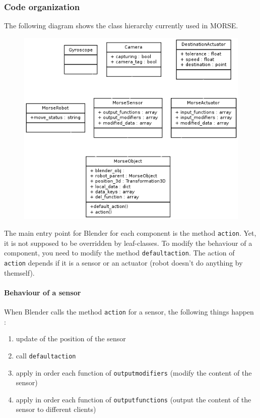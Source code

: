 \documentclass[twoside,a4paper,10pt]{report}
\newcommand{\dokutitlelevelfour}[1]{\subsubsection{#1}}
\newcommand{\dokutitlelevelfive}[1]{\paragraph{#1}}
\newcommand{\dokumonospace}[1]{\texttt{#1}}
\newcommand{\dokuitem}{\item}
\begin{document}
\dokutitlelevelfour{Code organization}

The following diagram shows the class hierarchy currently used in MORSE.

\begin{figure}[h]
\centering
\includegraphics{morse_uml.png}
\end{figure}


The main entry point for Blender for each component is the method \dokumonospace{action}.
Yet, it is not supposed to be overridden by leaf-classes. To modify the
behaviour of a component, you need to modify the method \dokumonospace{default{\textunderscore}action}. The
action of \dokumonospace{action} depends if it is a sensor or an actuator (robot doesn't do
anything by themself). 


\dokutitlelevelfive{Behaviour of a sensor}

When Blender calls the method \dokumonospace{action} for a sensor, the following things
happen :


\begin{enumerate}\dokuitem  update of the position of the sensor
\dokuitem  call \dokumonospace{default{\textunderscore}action}
\dokuitem  apply in order each function of \dokumonospace{output{\textunderscore}modifiers} (modify the content of the sensor)
\dokuitem  apply in order each function of \dokumonospace{output{\textunderscore}functions} (output the content of the sensor to different clients)
\end{enumerate}
\end{document}
